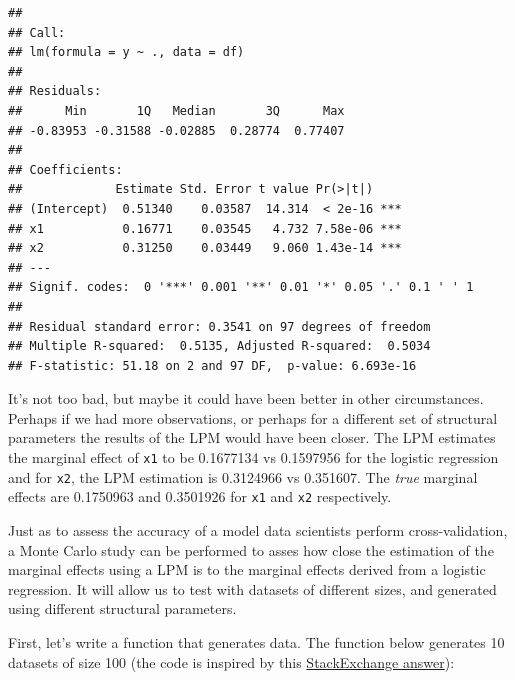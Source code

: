 \documentclass[
]{article}
\begin{document}
\begin{verbatim}
## 
## Call:
## lm(formula = y ~ ., data = df)
## 
## Residuals:
##      Min       1Q   Median       3Q      Max 
## -0.83953 -0.31588 -0.02885  0.28774  0.77407 
## 
## Coefficients:
##             Estimate Std. Error t value Pr(>|t|)    
## (Intercept)  0.51340    0.03587  14.314  < 2e-16 ***
## x1           0.16771    0.03545   4.732 7.58e-06 ***
## x2           0.31250    0.03449   9.060 1.43e-14 ***
## ---
## Signif. codes:  0 '***' 0.001 '**' 0.01 '*' 0.05 '.' 0.1 ' ' 1
## 
## Residual standard error: 0.3541 on 97 degrees of freedom
## Multiple R-squared:  0.5135, Adjusted R-squared:  0.5034 
## F-statistic: 51.18 on 2 and 97 DF,  p-value: 6.693e-16
\end{verbatim}

It's not too bad, but maybe it could have been better in other circumstances. Perhaps if we had more
observations, or perhaps for a different set of structural parameters the results of the LPM
would have been closer. The LPM estimates the marginal effect of \texttt{x1} to be
0.1677134 vs 0.1597956
for the logistic regression and for \texttt{x2}, the LPM estimation is 0.3124966
vs 0.351607. The \emph{true} marginal effects are
0.1750963 and 0.3501926 for \texttt{x1} and \texttt{x2} respectively.

Just as to assess the accuracy of a model data scientists perform cross-validation, a Monte Carlo
study can be performed to asses how close the estimation of the marginal effects using a LPM is
to the marginal effects derived from a logistic regression. It will allow us to test with datasets
of different sizes, and generated using different structural parameters.

First, let's write a function that generates data. The function below generates 10 datasets of size
100 (the code is inspired by this \href{https://stats.stackexchange.com/a/46525}{StackExchange answer}):
\end{document}
